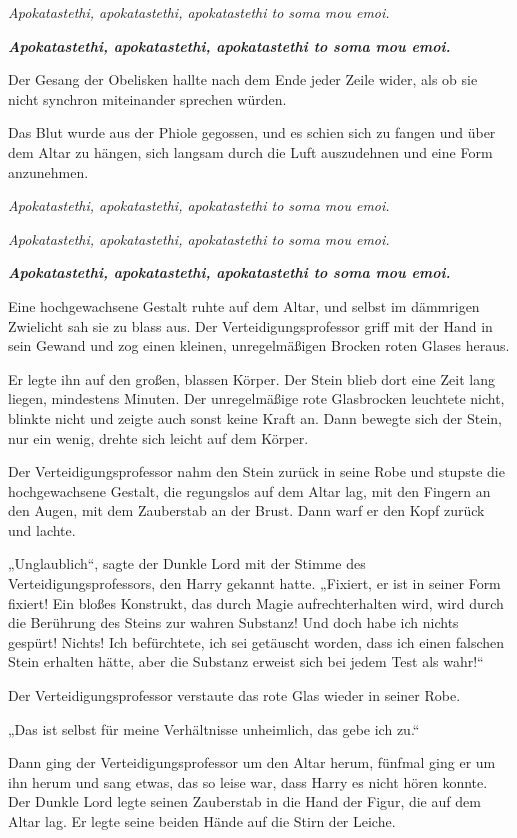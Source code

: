 {\emph{Apokatastethi, apokatastethi, apokatastethi to soma mou emoi.}

\textbf{\emph{Apokatastethi, apokatastethi, apokatastethi to soma mou emoi.}}

Der Gesang der Obelisken hallte nach dem Ende jeder Zeile wider, als ob sie nicht synchron miteinander sprechen würden.

Das Blut wurde aus der Phiole gegossen, und es schien sich zu fangen und über dem Altar zu hängen, sich langsam durch die Luft auszudehnen und eine Form anzunehmen.

\emph{Apokatastethi, apokatastethi, apokatastethi to soma mou emoi.}

\emph{Apokatastethi, apokatastethi, apokatastethi to soma mou emoi.}

\textbf{\emph{Apokatastethi, apokatastethi, apokatastethi to soma mou emoi.}}

Eine hochgewachsene Gestalt ruhte auf dem Altar, und selbst im dämmrigen Zwielicht sah sie zu blass aus. Der Verteidigungsprofessor griff mit der Hand in sein Gewand und zog einen kleinen, unregelmäßigen Brocken roten Glases heraus.

Er legte ihn auf den großen, blassen Körper. Der Stein blieb dort eine Zeit lang liegen, mindestens Minuten. Der unregelmäßige rote Glasbrocken leuchtete nicht, blinkte nicht und zeigte auch sonst keine Kraft an. Dann bewegte sich der Stein, nur ein wenig, drehte sich leicht auf dem Körper.

Der Verteidigungsprofessor nahm den Stein zurück in seine Robe und stupste die hochgewachsene Gestalt, die regungslos auf dem Altar lag, mit den Fingern an den Augen, mit dem Zauberstab an der Brust. Dann warf er den Kopf zurück und lachte.

„Unglaublich“, sagte der Dunkle Lord mit der Stimme des Verteidigungsprofessors, den Harry gekannt hatte. „Fixiert, er ist in seiner Form fixiert! Ein bloßes Konstrukt, das durch Magie aufrechterhalten wird, wird durch die Berührung des Steins zur wahren Substanz! Und doch habe ich nichts gespürt! Nichts! Ich befürchtete, ich sei getäuscht worden, dass ich einen falschen Stein erhalten hätte, aber die Substanz erweist sich bei jedem Test als wahr!“

Der Verteidigungsprofessor verstaute das rote Glas wieder in seiner Robe.

„Das ist selbst für meine Verhältnisse unheimlich, das gebe ich zu.“

Dann ging der Verteidigungsprofessor um den Altar herum, fünfmal ging er um ihn herum und sang etwas, das so leise war, dass Harry es nicht hören konnte. Der Dunkle Lord legte seinen Zauberstab in die Hand der Figur, die auf dem Altar lag. Er legte seine beiden Hände auf die Stirn der Leiche.

}
